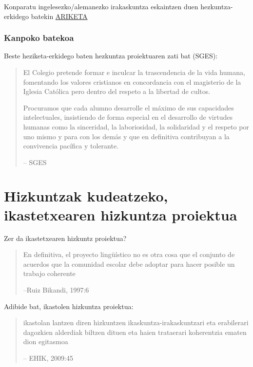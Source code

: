 \documentclass[
]{book}
\begin{document}
Konparatu ingelesezko/alemanezko irakaskuntza eskaintzen duen hezkuntza-erkidego batekin \protect\hyperlink{ariketa}{ARIKETA}

\hypertarget{kanpoko-batekoa}{%
\subsubsection{Kanpoko batekoa}\label{kanpoko-batekoa}}

Beste heziketa-erkidego baten hezkuntza proiektuaren zati bat (SGES):

\begin{quote}
El Colegio pretende formar e inculcar la trascendencia de la vida humana, fomentando los valores cristianos en concordancia con el magisterio de la Iglesia Católica pero dentro del respeto a la libertad de cultos.

Procuramos que cada alumno desarrolle el máximo de sus capacidades intelectuales, insistiendo de forma especial en el desarrollo de virtudes humanas como la sinceridad, la laboriosidad, la solidaridad y el respeto por uno mismo y para con los demás y que en definitiva contribuyan a la convivencia pacífica y tolerante.

-- SGES
\end{quote}

\hypertarget{hizkuntzak-kudeatzeko-ikastetxearen-hizkuntza-proiektua}{%
\section{Hizkuntzak kudeatzeko, ikastetxearen hizkuntza proiektua}\label{hizkuntzak-kudeatzeko-ikastetxearen-hizkuntza-proiektua}}

Zer da ikastetxearen hizkuntz proiektua?

\begin{quote}
En definitiva, el proyecto lingüístico no es otra cosa que el conjunto de acuerdos que la comunidad escolar debe adoptar para hacer posible un trabajo coherente

--Ruiz Bikandi, 1997:6
\end{quote}

Adibide bat, ikastolen hizkuntza proiektua:

\begin{quote}
ikastolan lantzen diren hizkuntzen ikaskuntza-irakaskuntzari eta erabilerari dagozkien alderdiak biltzen dituen eta haien trataerari koherentzia ematen dion egitasmoa

-- EHIK, 2009:45
\end{quote}
\end{document}
